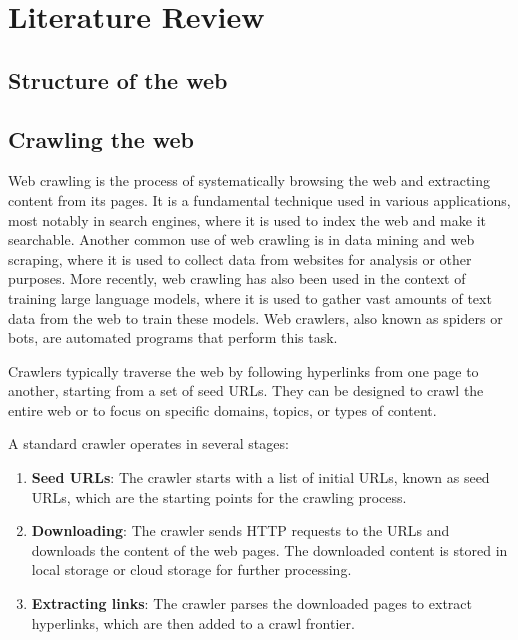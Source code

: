 \chapter{Literature Review}
\label{ch:literature_review}

\section{Structure of the web}\label{sec:web_structure}

\section{Crawling the web}\label{sec:web_crawling}

Web crawling is the process of systematically browsing the web and extracting content from its pages.
It is a fundamental technique used in various applications, most notably in search engines, where it is used to index the web and make it searchable.
Another common use of web crawling is in data mining and web scraping, where it is used to collect data from websites for analysis or other purposes.
More recently, web crawling has also been used in the context of training large language models, where it is used to gather vast amounts of text data from the web to train these models.
Web crawlers, also known as spiders or bots, are automated programs that perform this task.

Crawlers typically traverse the web by following hyperlinks from one page to another, starting from a set of seed URLs\cite{kumar2017survey}.
They can be designed to crawl the entire web or to focus on specific domains, topics, or types of content.

A standard crawler operates in several stages\cite{kausar2013web}:
\begin{enumerate}
    \item \textbf{Seed URLs}: The crawler starts with a list of initial URLs, known as seed URLs, which are the starting points for the crawling process.

    \item \textbf{Downloading}: The crawler sends HTTP requests to the URLs and downloads the content of the web pages.
    The downloaded content is stored in local storage or cloud storage for further processing.

    \item \textbf{Extracting links}: The crawler parses the downloaded pages to extract hyperlinks, which are then added to a crawl frontier.
\end{enumerate}


